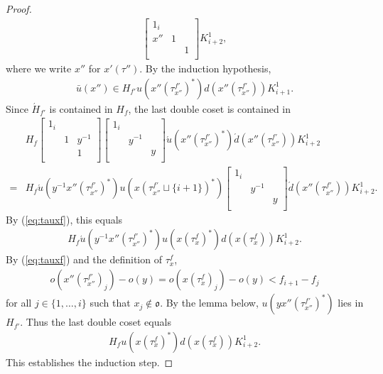 \documentclass[10pt,a4paper]{amsart}
\newcommand\ac{\acute}
\newcommand\bu{\bar{u}}
\newcommand\oo{\mathfrak{o}}
\begin{document}
\begin{proof}
\begin{align*}
\begin{bmatrix}
1_{i} & & \\
x'' &1 &  \\
& &1  \\
\end{bmatrix} K_{i+2}^1, 
\end{align*} 
where we write $x''$ for $x'(\tau'')$.
By the induction hypothesis, 
\begin{align*}
\bu(x'') \in H_{f'} u(x''(\tau_{x''}^{f'})^*)d(x''(\tau_{x''}^{f'})) K_{i+1}^1.
\end{align*} 
Since $\ac{H}_{f'}$ is contained in $H_f$, the last double coset is contained in 
\begin{align*}
& H_f \begin{bmatrix}
1_{i} & & \\
 &1 & y^{-1}  \\
 & &1  \\
\end{bmatrix}
\begin{bmatrix}
1_{i} & & \\
 &y^{-1} &  \\
 & &y  \\
\end{bmatrix} \ac{u}(x''(\tau_{x''}^{f'})^*)\ac{d}(x''(\tau_{x''}^{f'})) K_{i+2}^1 \\
=& 
H_f \ac{u}(y^{-1}x''(\tau_{x''}^{f'})^*) u(x(\tau_{x''}^{f'} \sqcup \{ i + 1\})^*) \begin{bmatrix}
1_{i} & & \\
 &y^{-1} &  \\
 & &y  \\
\end{bmatrix} \ac{d}(x''(\tau_{x''}^{f'})) K_{i+2}^1.
\end{align*} 
By (\ref{eq:tauxf}), this equals 
\begin{align*}
H_f \ac{u}(y^{-1}x''(\tau_{x''}^{f'})^*) u(x(\tau_x^f)^*) d(x(\tau_x^f)) K_{i+2}^1.
\end{align*}  
By (\ref{eq:tauxf}) and the definition of $\tau_x^f$,
\begin{align*}
o(x''(\tau_{x''}^{f'})_j) -o(y) = o(x(\tau_x^f)_j) -o(y) < f_{i+1} -  f_j
\end{align*} 
for all $ j \in \{1, \ldots, i \}$ such that $x_j \not\in \oo$.
By the lemma below, $u(y x''(\tau_{x''}^{f'})^*)$ lies in $H_{f'}$.
Thus the last double coset equals 
\begin{align*}
H_f u(x(\tau_x^f)^*) d(x(\tau_x^f)) K_{i+2}^1.
\end{align*}
This establishes the induction step.
\end{proof}
\end{document}
